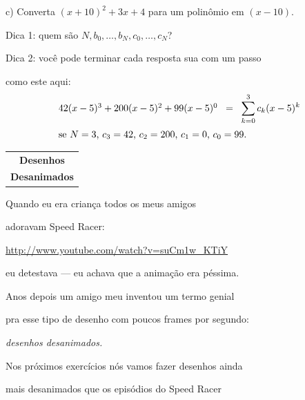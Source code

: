 \documentclass[oneside,12pt]{article}
\begin{document}
c) Converta $(x+10)^2 + 3x + 4$ para um polinômio em $(x-10)$.

\bsk

Dica 1: quem são $N, b_0, \ldots, b_N, c_0, \ldots, c_N$?

Dica 2: você pode terminar cada resposta sua com um passo

como este aqui:
%
$$\begin{array}{l}
  42(x-5)^3 + 200(x-5)^2 + 99(x-5)^0 \;\; = \;\; \displaystyle \sum_{k=0}^3 c_k (x-5)^k \\[15pt]
  \text{se $N=3$, $c_3=42$, $c_2=200$, $c_1=0$, $c_0=99$.} 
  \end{array}
$$


\thispagestyle{empty}

\begin{center}

\vspace*{2cm}

\begin{tabular}{c}
{\Large \bf Desenhos} \\[2.5pt]
{\Large \bf Desanimados} \\
\end{tabular}

\end{center}

\newpage


Quando eu era criança todos os meus amigos

adoravam Speed Racer:

\ssk

{\footnotesize

\url{http://www.youtube.com/watch?v=suCm1w_KTiY}

}

\ssk

eu detestava --- eu achava que a animação era péssima.

\msk

Anos depois um amigo meu inventou um termo genial

pra esse tipo de desenho com poucos frames por segundo:

{\sl desenhos desanimados.}

\msk

Nos próximos exercícios nós vamos fazer desenhos ainda

mais desanimados que os episódios do Speed Racer
\end{document}
